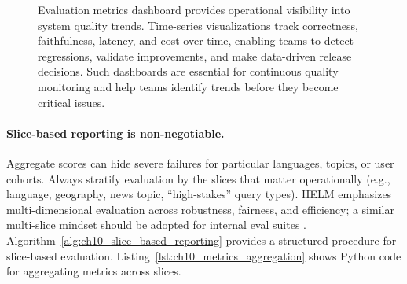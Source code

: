 \begin{figure}[t]
\begin{llmfigbox}
\end{llmfigbox}
\renewcommand{\LLMFigMaxWidth}{1.15\linewidth}
\caption{Evaluation metrics dashboard provides operational visibility into system quality trends. Time-series visualizations track correctness, faithfulness, latency, and cost over time, enabling teams to detect regressions, validate improvements, and make data-driven release decisions. Such dashboards are essential for continuous quality monitoring and help teams identify trends before they become critical issues.}
\label{fig:ch10_metrics_dashboard}
\end{figure}

\paragraph{Slice-based reporting is non-negotiable.}
Aggregate scores can hide severe failures for particular languages, topics, or user cohorts. Always stratify evaluation by the slices that matter operationally (e.g., language, geography, news topic, ``high-stakes'' query types). HELM emphasizes multi-dimensional evaluation across robustness, fairness, and efficiency; a similar multi-slice mindset should be adopted for internal eval suites \cite{helm_arxiv,helm_site}.
Algorithm~\ref{alg:ch10_slice_based_reporting} provides a structured procedure for slice-based evaluation. Listing~\ref{lst:ch10_metrics_aggregation} shows Python code for aggregating metrics across slices.

